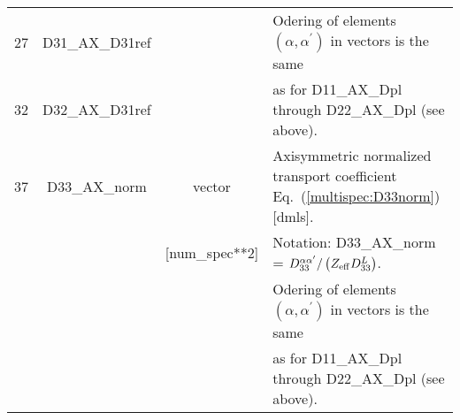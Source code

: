 \documentclass[preprint,prb,aps]{revtex4-1}
\newcommand{\eq}[1]{(\ref{#1})}
\begin{document}
\begin{table}[h]
\begin{tabular}{|c|c|c|l|}
\\
27 & D31\_AX\_D31ref & &
Odering of elements $(\alpha,\alpha^\prime)$ in vectors
is the same
\\
32 & D32\_AX\_D31ref & &
as for D11\_AX\_Dpl  through D22\_AX\_Dpl (see above).
\\
\hline
37 & D33\_AX\_norm & vector &
Axisymmetric normalized transport coefficient Eq.~\eq{multispec:D33norm} [dmls].
\\
 & & [num\_spec**2] &
Notation: D33\_AX\_norm = $D^{\alpha \alpha'}_{33}/\left(Z_{\rm eff} D_{33}^{L}\right)$.
\\
 & & &
Odering of elements $(\alpha,\alpha^\prime)$ in vectors
is the same
\\
 & & &
as for D11\_AX\_Dpl  through D22\_AX\_Dpl (see above).
\\
\hline
\hline
\end{tabular}
\end{table}
\end{document}

